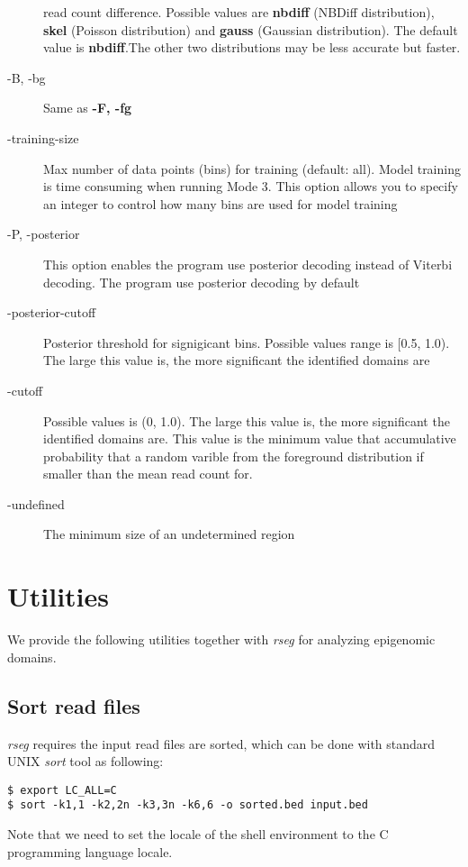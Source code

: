 \documentclass[11pt]{report}
\begin{document}
\begin{description}
  read count difference. Possible values are \textbf{nbdiff} (NBDiff
  distribution), \textbf{skel} (Poisson distribution) and
  \textbf{gauss} (Gaussian distribution). The default value is
  \textbf{nbdiff}.The other two distributions may be less accurate but
  faster.
\item[-B, -bg] Same as \textbf{-F, -fg}
\item[-training-size] Max number of data points (bins) for training (default:
  all). Model training is time consuming when running Mode 3. This option allows
  you to specify an integer to control how many bins are used for model training
\item[-P, -posterior] This option enables the program use posterior
  decoding instead of Viterbi decoding. The program use posterior
  decoding by default
\item[-posterior-cutoff] Posterior threshold for signigicant
  bins. Possible values range is [0.5, 1.0). The large this value is,
  the more significant the identified domains are
\item[-cutoff] Possible values is (0, 1.0). The large this value
  is, the more significant the identified domains are. This value is
  the minimum value that accumulative probability that a random
  varible from the foreground distribution if smaller than the mean
  read count for.
\item[-undefined] The minimum size of an undetermined region
\end{description}


\section{Utilities}
\label{sec:utilities}

We provide the following utilities together with \textit{rseg} for
analyzing epigenomic domains.

\subsection{Sort read files}
\label{sec:sortbed}

\textit{rseg} requires the input read files are sorted, which can be
done with standard UNIX \textit{sort} tool as following:
\begin{verbatim}
$ export LC_ALL=C
$ sort -k1,1 -k2,2n -k3,3n -k6,6 -o sorted.bed input.bed
\end{verbatim}
Note that we need to set the locale of the shell environment to the C
programming language locale. 
\end{document}

